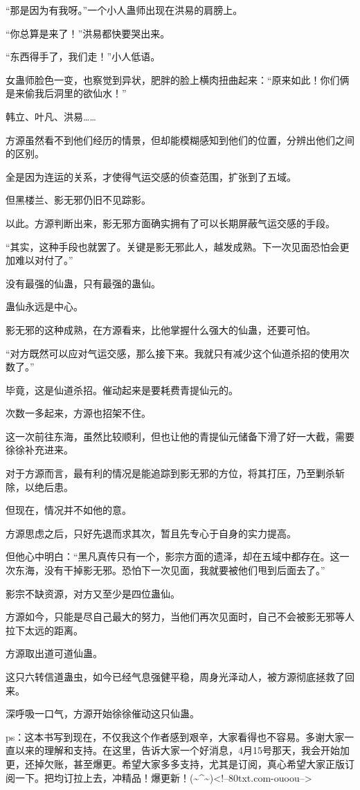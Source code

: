 \begin{this_body}
“那是因为有我呀。”一个小人蛊师出现在洪易的肩膀上。

“你总算是来了！”洪易都快要哭出来。

“东西得手了，我们走！”小人低语。

女蛊师脸色一变，也察觉到异状，肥胖的脸上横肉扭曲起来：“原来如此！你们俩是来偷我后洞里的欲仙水！”

韩立、叶凡、洪易……

方源虽然看不到他们经历的情景，但却能模糊感知到他们的位置，分辨出他们之间的区别。

全是因为连运的关系，才使得气运交感的侦查范围，扩张到了五域。

但黑楼兰、影无邪仍旧不见踪影。

以此。方源判断出来，影无邪方面确实拥有了可以长期屏蔽气运交感的手段。

“其实，这种手段也就罢了。关键是影无邪此人，越发成熟。下一次见面恐怕会更加难以对付了。”

没有最强的仙蛊，只有最强的蛊仙。

蛊仙永远是中心。

影无邪的这种成熟，在方源看来，比他掌握什么强大的仙蛊，还要可怕。

“对方既然可以应对气运交感，那么接下来。我就只有减少这个仙道杀招的使用次数了。”

毕竟，这是仙道杀招。催动起来是要耗费青提仙元的。

次数一多起来，方源也招架不住。

这一次前往东海，虽然比较顺利，但也让他的青提仙元储备下滑了好一大截，需要徐徐补充进来。

对于方源而言，最有利的情况是能追踪到影无邪的方位，将其打压，乃至剿杀斩除，以绝后患。

但现在，情况并不如他的意。

方源思虑之后，只好先退而求其次，暂且先专心于自身的实力提高。

但他心中明白：“黑凡真传只有一个，影宗方面的遗泽，却在五域中都存在。这一次东海，没有干掉影无邪。恐怕下一次见面，我就要被他们甩到后面去了。”

影宗不缺资源，对方又至少是四位蛊仙。

方源如今，只能是尽自己最大的努力，当他们再次见面时，自己不会被影无邪等人拉下太远的距离。

方源取出道可道仙蛊。

这只六转信道蛊虫，如今已经气息强健平稳，周身光泽动人，被方源彻底拯救了回来。

深呼吸一口气，方源开始徐徐催动这只仙蛊。

ps：这本书写到现在，不仅我这个作者感到艰辛，大家看得也不容易。多谢大家一直以来的理解和支持。在这里，告诉大家一个好消息，4月15号那天，我会开始加更，还掉欠账，甚至爆更。希望大家多多支持，尤其是订阅，真心希望大家正版订阅一下。把均订拉上去，冲精品！爆更新！(\~{}\^{}\~{})<!--80txt.com-ouoou-->

\end{this_body}

